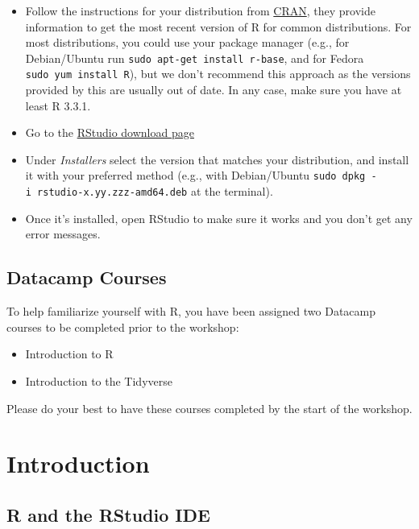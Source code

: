 \documentclass[]{book}
\providecommand{\tightlist}{%
  \setlength{\itemsep}{0pt}\setlength{\parskip}{0pt}}
\begin{document}
\begin{itemize}
\tightlist
\item
  Follow the instructions for your distribution
  from \href{https://cloud.r-project.org/bin/linux}{CRAN}, they provide information
  to get the most recent version of R for common distributions. For most
  distributions, you could use your package manager (e.g., for Debian/Ubuntu run
  \texttt{sudo\ apt-get\ install\ r-base}, and for Fedora \texttt{sudo\ yum\ install\ R}), but we
  don't recommend this approach as the versions provided by this are
  usually out of date. In any case, make sure you have at least R 3.3.1.
\item
  Go to the
  \href{https://www.rstudio.com/products/rstudio/download/\#download}{RStudio download page}
\item
  Under \emph{Installers} select the version that matches your distribution, and
  install it with your preferred method (e.g., with Debian/Ubuntu \texttt{sudo\ dpkg\ -i\ rstudio-x.yy.zzz-amd64.deb} at the terminal).
\item
  Once it's installed, open RStudio to make sure it works and you don't get any
  error messages.
\end{itemize}

\hypertarget{datacamp-courses}{%
\section{Datacamp Courses}\label{datacamp-courses}}

To help familiarize yourself with R, you have been assigned two Datacamp courses to be completed prior to the workshop:

\begin{itemize}
\tightlist
\item
  Introduction to R
\item
  Introduction to the Tidyverse
\end{itemize}

Please do your best to have these courses completed by the start of the workshop.

\hypertarget{introduction}{%
\chapter{Introduction}\label{introduction}}

\hypertarget{r-and-the-rstudio-ide}{%
\section{R and the RStudio IDE}\label{r-and-the-rstudio-ide}}
\end{document}
